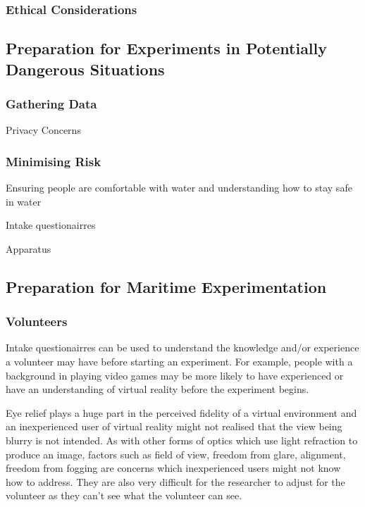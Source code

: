 \documentclass[12pt]{article}
\begin{document}
\subsubsection{Ethical Considerations}



\subsection{Preparation for Experiments in Potentially Dangerous Situations}

\subsubsection{Gathering Data}

Privacy Concerns

\subsubsection{Minimising Risk}

Ensuring people are comfortable with water and understanding how to stay safe in water

Intake questionairres 

Apparatus

\subsection{Preparation for Maritime Experimentation}

\subsubsection{Volunteers}

Intake questionairres can be used to understand the knowledge and/or experience a volunteer may have before starting an experiment. For example, people with a background in playing video games may be more likely to have experienced or have an understanding of virtual reality before the experiment begins. 

Eye relief plays a huge part in the perceived fidelity of a virtual environment and an inexperienced user of virtual reality might not realised that the view being blurry is not intended. As with other forms of optics which use light refraction to produce an image, factors such as field of view, freedom from glare, alignment, freedom from fogging \cite{angel2005examination} are concerns which inexperienced users might not know how to address. They are also very difficult for the researcher to adjust for the volunteer as they can't see what the volunteer can see.
\end{document}
